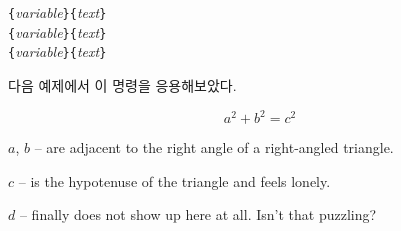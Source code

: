 \begin{lscommand}
\verb|{|\emph{variable}\verb|}{|\emph{text}\verb|}|\\
\verb|{|\emph{variable}\verb|}{|\emph{text}\verb|}|\\
\verb|{|\emph{variable}\verb|}{|\emph{text}\verb|}|
\end{lscommand}

\noindent 다음 예제에서 이 명령을 응용해보았다.

\enlargethispage*{2\onelineskip}






\begin{example}
\flushleft
\newenvironment{vardesc}[1]{%
  \settowidth{\parindent}{#1:\ }
  \makebox[0pt][r]{#1:\ }}{}

\begin{displaymath}
a^2+b^2=c^2
\end{displaymath}

\begin{vardesc}{Where}$a$,
$b$ -- are adjacent to the right
angle of a right-angled triangle.

$c$ -- is the hypotenuse of
the triangle and feels lonely.

$d$ -- finally does not show up
here at all. Isn't that puzzling?
\end{vardesc}
\end{example}

